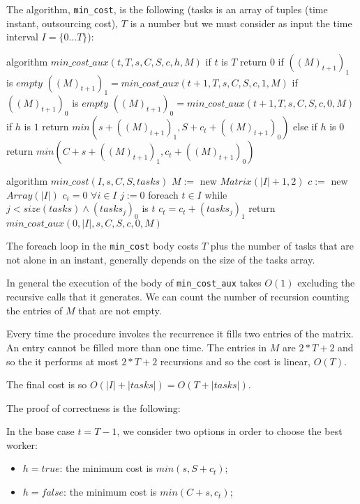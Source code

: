 \documentclass[paper=a4, fontsize=11pt]{scrartcl} %
\numberwithin{equation}{section} %
\numberwithin{figure}{section} %
\numberwithin{table}{section} %
\begin{document}
The algorithm, \verb|min_cost|, is the following (tasks is an array of tuples (time instant, outsourcing cost), $T$ is a number but we must consider as input the time interval $I = \{0 ... T\}$):

\begin{pseudo}
algorithm $min\_cost\_aux(t, T, s, C, S, c, h, M)$
    if $t$ is $T$
        return $0$
    if $((M)_{t+1})_1$ is $empty$
         $((M)_{t+1})_1 = min\_cost\_aux(t+1, T, s, C, S, c, 1, M)$
    if $((M)_{t+1})_0$ is $empty$
         $((M)_{t+1})_0 = min\_cost\_aux(t+1, T, s, C, S, c, 0, M)$
    if $h$ is $1$
        return $min(s + ((M)_{t+1})_1, S + c_t + ((M)_{t+1})_0)$
    else if $h$ is $0$
        return $min(C + s + ((M)_{t+1})_1, c_t + ((M)_{t+1})_0)$
\end{pseudo}
\begin{pseudo}
algorithm $min\_cost(I, s, C, S, tasks)$
    $M :=$ new $Matrix(|I|+1, 2)$
    $c :=$ new $Array(|I|)$
    $c_i = 0$ $\forall i \in I$
    $j := 0$
    foreach $t \in I$
        while $j < size(tasks) \land (tasks_j)_0$ is $t$
            $c_t = c_t + (tasks_j)_1$
    return $min\_cost\_aux(0, |I|, s, C, S, c, 0, M)$
\end{pseudo}

The foreach loop in the \verb|min_cost| body costs $T$ plus the number of tasks that are not alone in an instant, generally depends on the size of the tasks array.

In general the execution of the body of \verb|min_cost_aux| takes $O(1)$ excluding the recursive calls that it generates. We can count the number of recursion counting the entries of $M$ that are not empty.

Every time the procedure invokes the recurrence it fills two entries of the matrix. An entry cannot be filled more than one time. The entries in $M$ are $2*T+2$ and so the it performs at most $2*T+2$ recursions and so the cost is linear, $O(T)$.

The final cost is so $O(|I| + |tasks|) = O(T + |tasks|)$.

The proof of correctness is the following:

In the base case $t = T-1$, we consider two options in order to choose the best worker:
\begin{itemize}
    \item $h = true$: the minimum cost is $min(s, S + c_t)$;
    \item $h = false$: the minimum cost is $min(C + s, c_t)$;
\end{itemize}
\end{document}
